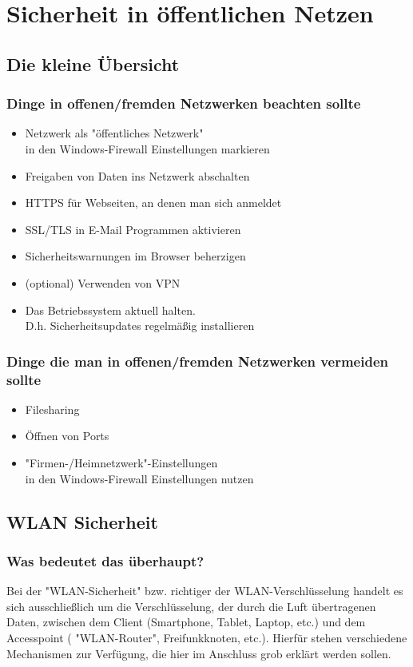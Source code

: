 \section{Sicherheit in öffentlichen Netzen}
\subsection{Die kleine Übersicht}

\subsubsection{Dinge in offenen/fremden Netzwerken beachten sollte}
\begin{itemize}
\item Netzwerk als "öffentliches Netzwerk" \\in den Windows-Firewall Einstellungen markieren
\item Freigaben von Daten ins Netzwerk abschalten
\item HTTPS für Webseiten, an denen man sich anmeldet
\item SSL/TLS in E-Mail Programmen aktivieren
\item Sicherheitswarnungen im Browser beherzigen
\item (optional) Verwenden von VPN
\item Das Betriebssystem aktuell halten. \\D.h. Sicherheitsupdates regelmäßig installieren
\end{itemize}

\subsubsection{Dinge die man in offenen/fremden Netzwerken vermeiden sollte}

\begin{itemize}
\item Filesharing
\item Öffnen von Ports
\item "Firmen-/Heimnetzwerk"-Einstellungen \\in den Windows-Firewall Einstellungen nutzen
\end{itemize}

\subsection{WLAN Sicherheit}
\subsubsection{Was bedeutet das überhaupt?}
Bei der  "WLAN-Sicherheit"  bzw. richtiger der WLAN-Verschlüsselung handelt es 
sich ausschließlich um die Verschlüsselung, der durch die Luft übertragenen 
Daten, zwischen dem Client (Smartphone, Tablet, Laptop, etc.) und dem 
Accesspoint ( "WLAN-Router", Freifunkknoten, etc.). Hierfür stehen verschiedene 
Mechanismen zur Verfügung, die hier im Anschluss grob erklärt werden sollen.


